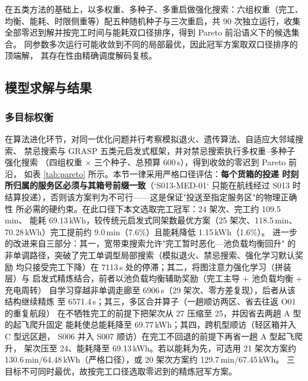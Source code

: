在五类方法的基础上，以多权重、多种子、多重启做强化搜索：六组权重（完工、
均衡、能耗、时限侧重等）配五种随机种子与三次重启，共 90 次独立运行，收集
全部零迟到解并按完工时间与能耗双口径排序，得到 Pareto 前沿语义下的候选集合。
同参数多次运行可能收敛到不同的局部最优，因此冠军方案取双口径排序的顶端解，
其存在性由精确调度解码复核。

\subsection{模型求解与结果}

\subsubsection{多目标权衡}

在算法进化环节，对同一优化问题并行考察模拟退火、遗传算法、自适应大邻域搜索、
禁忌搜索与 GRASP 五类元启发式框架，并对禁忌搜索执行多权重--多种子强化搜索
（四组权重 $\times$ 三个种子、总预算 600\,s），得到收敛的零迟到 Pareto 前沿，
如表 \ref{tab:pareto} 所示。本节一律采用严格口径评估：\textbf{每个货箱的投递
时刻所归属的服务区必须与其箱号前缀一致}（`S013-MED-01` 只能在航线经过 S013
时结算投递），否则该方案判为不可行——这是保证"投送至指定服务区"的物理正确性
所必需的硬约束。在此口径下本文选取完工冠军：24 架次、完工约 109.5\,min、
能耗 69.13\,kWh，较传统元启发式同架数最优方案（25 架次、118.5\,min、
70.28\,kWh）完工提前约 9.0\,min（7.6\%）且能耗降低 1.15\,kWh（1.6\%）。
进一步的改进来自三部分：其一，宽带束搜索允许"完工暂时恶化—池负载均衡回升"
的非单调路径，突破了完工单调型局部搜索（模拟退火、禁忌搜索、强化学习默认奖励
均只接受完工下降）在 7113\,s 处的停滞；其二，将图注意力强化学习（拼装层）与
启发式精炼结合，前者以池负载均衡辅助奖励（完工主导 + 池负载均衡 + 充电周转）
自学习穿越非单调走廊至 6906\,s（29 架次、零方差复现），后者从该结构继续精炼
至 6571.4\,s；其三，多区合并算子（一趟顺访两区、省去往返 O01 的重复航段）
在不牺牲完工的前提下把架次从 27 压缩至 25，并因省去两趟 A 型的起飞爬升固定
能耗使总能耗降至 69.77\,kWh；其四，跨机型顺访（轻区箱并入 C 型远区趟，
S006 并入 S007 顺访）在完工不回退的前提下再省一趟 A 型起飞爬升，
架次压至 24、能耗降至 69.13\,kWh。若以能耗为先，可选用 21 架次方案约
130.6\,min/64.48\,kWh（严格口径），或 20 架次方案约 129.7\,min/67.45\,kWh。
三目标不可同时最优，故按完工口径选取零迟到的精炼冠军方案。

